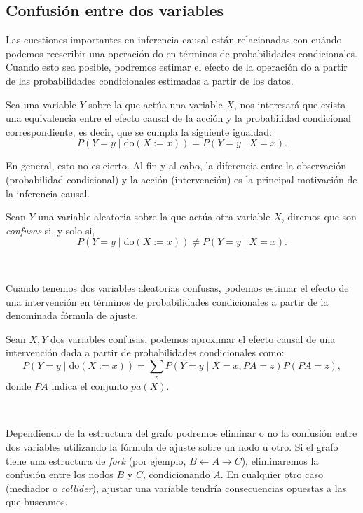 \documentclass[oneside,openright,titlepage,numbers=noenddot,openany,headinclude,footinclude=true,
cleardoublepage=empty,abstractoff,BCOR=5mm,paper=a4,fontsize=12pt,main=spanish]{scrreprt}
\begin{document}
\subsection{Confusión entre dos variables}

Las cuestiones importantes en inferencia causal están relacionadas con cuándo podemos reescribir una operación do en términos de probabilidades condicionales. Cuando esto sea posible, podremos estimar el efecto de la operación do a partir de las probabilidades condicionales estimadas a partir de los datos. 

Sea una variable $Y$ sobre la que actúa una variable $X$, nos interesará que exista una equivalencia entre el efecto causal de la acción y la probabilidad condicional correspondiente, es decir, que se cumpla la siguiente igualdad: 
\begin{equation*}
P(Y=y \mid \text{do}(X:=x))=P(Y=y \mid X=x).
\end{equation*}

En general, esto no es cierto. Al fin y al cabo, la diferencia entre la observación (probabilidad condicional) y la acción (intervención) es la principal motivación de la inferencia causal.\\

\begin{definition}[Confusión]
Sean $Y$ una variable aleatoria sobre la que actúa otra variable $X$, diremos que son \textit{confusas} si, y solo si, $$P(Y=y \mid \text{do}(X:=x)) \neq P(Y=y \mid X=x).$$
\end{definition}\

Cuando tenemos dos variables aleatorias confusas, podemos estimar el efecto de una intervención en términos de probabilidades condicionales a partir de la denominada fórmula de ajuste.\\

\begin{proposition} \label{prop:forajuste}
Sean $X,Y$ dos variables confusas, podemos aproximar el efecto causal de una intervención dada a partir de probabilidades condicionales como: $$P(Y=y \mid \text{do}(X:=x))=\sum_{z}P(Y=y \mid X=x,PA=z)P(PA=z),$$
donde $PA$ indica el conjunto $pa(X)$.
\end{proposition}\

Dependiendo de la estructura del grafo podremos eliminar o no la confusión entre dos variables utilizando la fórmula de ajuste sobre un nodo u otro. Si el grafo tiene una estructura de \textit{fork} (por ejemplo, $B \leftarrow A \to C$), eliminaremos la confusión entre los nodos $B$ y $C$, condicionando $A$. En cualquier otro caso (mediador o \textit{collider}), ajustar una variable tendría consecuencias opuestas a las que buscamos.
\end{document}
